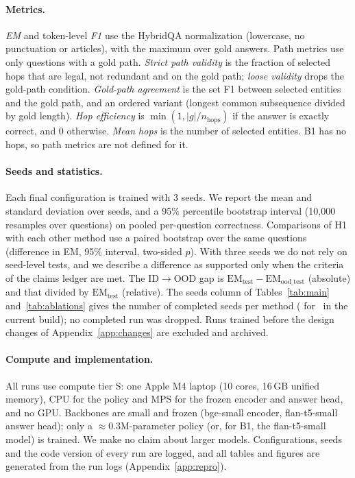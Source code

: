\paragraph{Metrics.}
\emph{EM} and token-level \emph{F1} use the HybridQA normalization (lowercase, no punctuation or articles), with the maximum over gold answers.
Path metrics use only questions with a gold path.
\emph{Strict path validity} is the fraction of selected hops that are legal, not redundant and on the gold path; \emph{loose validity} drops the gold-path condition.
\emph{Gold-path agreement} is the set F1 between selected entities and the gold path, and an ordered variant (longest common subsequence divided by gold length).
\emph{Hop efficiency} is $\min(1,|g|/n_{\text{hops}})$ if the answer is exactly correct, and $0$ otherwise.
\emph{Mean hops} is the number of selected entities.
B1 has no hops, so path metrics are not defined for it.

\paragraph{Seeds and statistics.}
Each final configuration is trained with 3 seeds.
We report the mean and standard deviation over seeds, and a 95\% percentile bootstrap interval (10{,}000 resamples over questions) on pooled per-question correctness.
Comparisons of H1 with each other method use a paired bootstrap over the same questions (difference in EM, 95\% interval, two-sided $p$).
With three seeds we do not rely on seed-level tests, and we describe a difference as supported only when the criteria of the claims ledger are met.
The ID$\rightarrow$OOD gap is $\mathrm{EM}_{\text{test}}-\mathrm{EM}_{\text{ood\_test}}$ (absolute) and that divided by $\mathrm{EM}_{\text{test}}$ (relative).
The seeds column of Tables~\ref{tab:main} and~\ref{tab:ablations} gives the number of completed seeds per method ( for \hop\ in the current build); no completed run was dropped. Runs trained before the design changes of Appendix~\ref{app:changes} are excluded and archived.

\paragraph{Compute and implementation.}
All runs use compute tier S: one Apple M4 laptop (10 cores, 16\,GB unified memory), CPU for the policy and MPS for the frozen encoder and answer head, and no GPU.
Backbones are small and frozen (bge-small encoder, flan-t5-small answer head); only a $\approx$0.3M-parameter policy (or, for B1, the flan-t5-small model) is trained.
We make no claim about larger models.
Configurations, seeds and the code version of every run are logged, and all tables and figures are generated from the run logs (Appendix~\ref{app:repro}).

